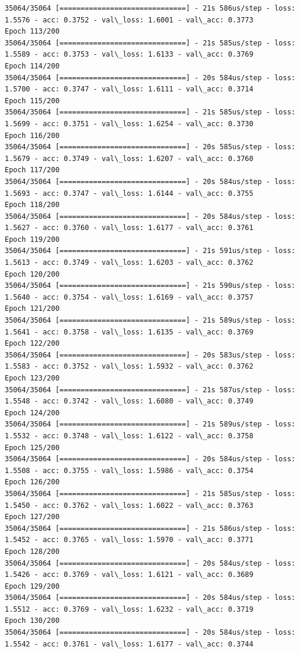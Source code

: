 \documentclass[11pt]{article}
\begin{document}
\begin{Verbatim}[commandchars=\\\{\}]
35064/35064 [==============================] - 21s 586us/step - loss: 1.5576 - acc: 0.3752 - val\_loss: 1.6001 - val\_acc: 0.3773
Epoch 113/200
35064/35064 [==============================] - 21s 585us/step - loss: 1.5589 - acc: 0.3753 - val\_loss: 1.6133 - val\_acc: 0.3769
Epoch 114/200
35064/35064 [==============================] - 20s 584us/step - loss: 1.5700 - acc: 0.3747 - val\_loss: 1.6111 - val\_acc: 0.3714
Epoch 115/200
35064/35064 [==============================] - 21s 585us/step - loss: 1.5699 - acc: 0.3751 - val\_loss: 1.6254 - val\_acc: 0.3730
Epoch 116/200
35064/35064 [==============================] - 20s 585us/step - loss: 1.5679 - acc: 0.3749 - val\_loss: 1.6207 - val\_acc: 0.3760
Epoch 117/200
35064/35064 [==============================] - 20s 584us/step - loss: 1.5693 - acc: 0.3747 - val\_loss: 1.6144 - val\_acc: 0.3755
Epoch 118/200
35064/35064 [==============================] - 20s 584us/step - loss: 1.5627 - acc: 0.3760 - val\_loss: 1.6177 - val\_acc: 0.3761
Epoch 119/200
35064/35064 [==============================] - 21s 591us/step - loss: 1.5613 - acc: 0.3749 - val\_loss: 1.6203 - val\_acc: 0.3762
Epoch 120/200
35064/35064 [==============================] - 21s 590us/step - loss: 1.5640 - acc: 0.3754 - val\_loss: 1.6169 - val\_acc: 0.3757
Epoch 121/200
35064/35064 [==============================] - 21s 589us/step - loss: 1.5641 - acc: 0.3758 - val\_loss: 1.6135 - val\_acc: 0.3769
Epoch 122/200
35064/35064 [==============================] - 20s 583us/step - loss: 1.5583 - acc: 0.3752 - val\_loss: 1.5932 - val\_acc: 0.3762
Epoch 123/200
35064/35064 [==============================] - 21s 587us/step - loss: 1.5548 - acc: 0.3742 - val\_loss: 1.6080 - val\_acc: 0.3749
Epoch 124/200
35064/35064 [==============================] - 21s 589us/step - loss: 1.5532 - acc: 0.3748 - val\_loss: 1.6122 - val\_acc: 0.3758
Epoch 125/200
35064/35064 [==============================] - 20s 584us/step - loss: 1.5508 - acc: 0.3755 - val\_loss: 1.5986 - val\_acc: 0.3754
Epoch 126/200
35064/35064 [==============================] - 21s 585us/step - loss: 1.5450 - acc: 0.3762 - val\_loss: 1.6022 - val\_acc: 0.3763
Epoch 127/200
35064/35064 [==============================] - 21s 586us/step - loss: 1.5452 - acc: 0.3765 - val\_loss: 1.5970 - val\_acc: 0.3771
Epoch 128/200
35064/35064 [==============================] - 20s 584us/step - loss: 1.5426 - acc: 0.3769 - val\_loss: 1.6121 - val\_acc: 0.3689
Epoch 129/200
35064/35064 [==============================] - 20s 584us/step - loss: 1.5512 - acc: 0.3769 - val\_loss: 1.6232 - val\_acc: 0.3719
Epoch 130/200
35064/35064 [==============================] - 20s 584us/step - loss: 1.5542 - acc: 0.3761 - val\_loss: 1.6177 - val\_acc: 0.3744

\end{Verbatim}
\end{document}
